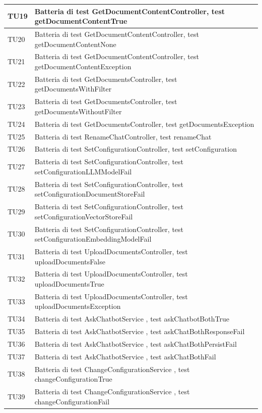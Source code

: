 \documentclass[10pt, a4paper]{article}
\begin{document}
\begin{xltabular}{\textwidth}{p{0.12\textwidth}|X}
\hline
TU19 & Batteria di test GetDocumentContentController, test getDocumentContentTrue \\
\hline
TU20 & Batteria di test GetDocumentContentController, test getDocumentContentNone \\
\hline
TU21 & Batteria di test GetDocumentContentController, test getDocumentContentException \\
\hline
TU22 & Batteria di test GetDocumentsController, test getDocumentsWithFilter \\
\hline
TU23 & Batteria di test GetDocumentsController, test getDocumentsWithoutFilter \\
\hline
TU24 & Batteria di test GetDocumentsController, test getDocumentsException \\
\hline
TU25 & Batteria di test RenameChatController, test renameChat \\
\hline
TU26 & Batteria di test SetConfigurationController, test setConfiguration \\
\hline
TU27 & Batteria di test SetConfigurationController, test setConfigurationLLMModelFail \\
\hline
TU28 & Batteria di test SetConfigurationController, test setConfigurationDocumentStoreFail \\
\hline
TU29 & Batteria di test SetConfigurationController, test setConfigurationVectorStoreFail \\
\hline
TU30 & Batteria di test SetConfigurationController, test setConfigurationEmbeddingModelFail \\
\hline
TU31 & Batteria di test UploadDocumentsController, test uploadDocumentsFalse \\
\hline
TU32 & Batteria di test UploadDocumentsController, test uploadDocumentsTrue \\
\hline
TU33 & Batteria di test UploadDocumentsController, test uploadDocumentsException \\
\hline
TU34 & Batteria di test AskChatbotService , test askChatbotBothTrue \\
\hline
TU35 & Batteria di test AskChatbotService , test askChatBothResponseFail \\
\hline
TU36 & Batteria di test AskChatbotService , test askChatBothPersistFail \\
\hline
TU37 & Batteria di test AskChatbotService , test askChatBothFail \\
\hline
TU38 & Batteria di test ChangeConfigurationService , test changeConfigurationTrue \\
\hline
TU39 & Batteria di test ChangeConfigurationService , test changeConfigurationFail \\

\end{xltabular}
\end{document}
